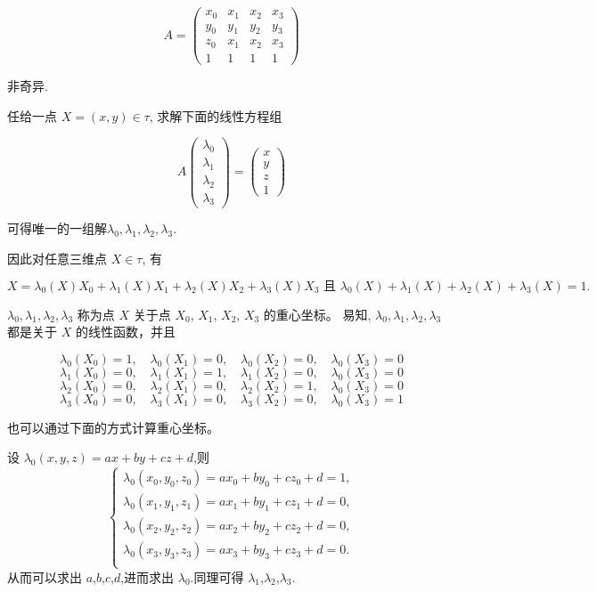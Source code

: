 \documentclass[12pt,a4paper]{article}
\begin{document}
$$
A = 
\begin{pmatrix}
x_0 & x_1 & x_2 & x_3\\
y_0 & y_1 & y_2 & y_3\\
z_0 & x_1 & x_2 & x_3\\
1   & 1   & 1 & 1
\end{pmatrix}
$$

非奇异. 

任给一点 $X=(x,y)\in\tau$, 求解下面的线性方程组

$$
A 
\begin{pmatrix}
\lambda_0 \\
\lambda_1\\
\lambda_2 \\
\lambda_3
\end{pmatrix}
=\begin{pmatrix}
x \\
y\\
z \\
1  
\end{pmatrix}
$$

可得唯一的一组解$\lambda_0,\lambda_1,\lambda_2, \lambda_3$. 

因此对任意三维点 $X\in\tau$, 有

$$
X=\lambda_0(X)X_0 + \lambda_1(X)X_1 + \lambda_2(X)X_2 + \lambda_3(X)X_3 
\text{ 且 } \lambda_0(X) + \lambda_1(X) + \lambda_2(X) + \lambda_3(X) = 1. 
$$

$\lambda_0,\lambda_1,\lambda_2, \lambda_3$ 称为点 $X$ 关于点 $X_0$, $X_1$, $X_2$, $X_3$ 的重心坐标。
易知, $\lambda_0, \lambda_1, \lambda_2, \lambda_3$ 都是关于 $X$ 的线性函数，并且

$$
\lambda_0(X_0) = 1,\quad \lambda_0(X_1) = 0,\quad \lambda_0(X_2) = 0,\quad \lambda_0(X_3) = 0
$$
$$\lambda_1(X_0) = 0,\quad \lambda_1(X_1) = 1,\quad \lambda_1(X_2) = 0,\quad \lambda_0(X_3) = 0
$$
$$
\lambda_2(X_0) = 0,\quad \lambda_2(X_1) = 0,\quad \lambda_2(X_2) = 1,\quad \lambda_0(X_3) = 0
$$
$$
\lambda_3(X_0) = 0,\quad \lambda_3(X_1) = 0,\quad \lambda_3(X_2) = 0,\quad \lambda_0(X_3) = 1
$$

也可以通过下面的方式计算重心坐标。

设 $\lambda_0 (x,y,z)=ax+by+cz+d$,则
$$
\begin{cases}
\lambda _0 (x_0,y_0,z_0)=ax_0+by_0+cz_0+d=1,\\
\lambda _0 (x_1,y_1,z_1)=ax_1+by_1+cz_1+d=0,\\
\lambda _0 (x_2,y_2,z_2)=ax_2+by_2+cz_2+d=0,\\
\lambda _0 (x_3,y_3,z_3)=ax_3+by_3+cz_3+d=0.\\
\end{cases}
$$
从而可以求出 $a$,$b$,$c$,$d$,进而求出 $\lambda _0$.同理可得 $\lambda _1$,$\lambda _2$,$\lambda _3$.
\end{document}
